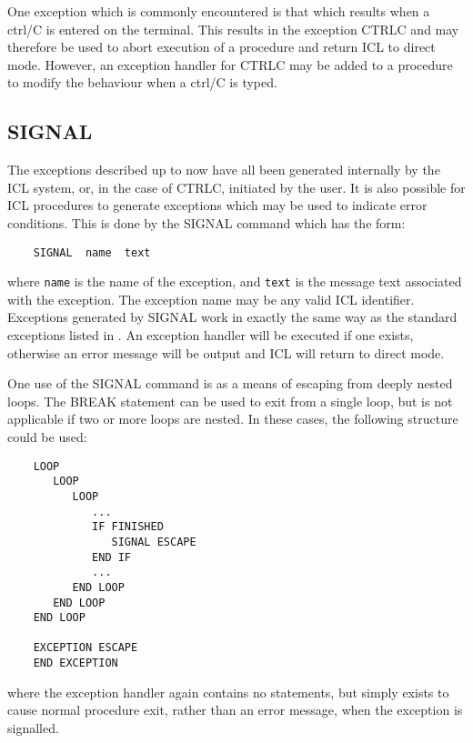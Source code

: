 One exception which is commonly encountered is that which results when a
ctrl/C is entered on the terminal.
This results in the exception CTRLC and may therefore be used to abort execution
of a procedure and return ICL to direct mode.
However, an exception handler for CTRLC may be added to a procedure to modify
the behaviour when a ctrl/C is typed.

\subsection{SIGNAL}

The exceptions described up to now have all been generated internally by the
ICL system, or, in the case of CTRLC, initiated by the user.
It is also possible for ICL procedures to generate exceptions which may be used
to indicate error conditions.
This is done by the SIGNAL command which has the form:

\begin{small}
\begin{verbatim}
    SIGNAL  name  text
\end{verbatim}
\end{small}

where \verb+name+ is the name of the exception, and \verb+text+ is the message
text associated with the exception.
The exception name may be any valid ICL identifier.
Exceptions generated by SIGNAL work in exactly the same way as the standard
exceptions listed in .
An exception handler will be executed if one exists, otherwise an error message
will be output and ICL will return to direct mode.

One use of the SIGNAL command is as a means of escaping from deeply nested
loops.
The BREAK statement can be used to exit from a single loop, but is not
applicable if two or more loops are nested.
In these cases, the following structure could be used:

\begin{small}
\begin{verbatim}
    LOOP
       LOOP
          LOOP
             ...
             IF FINISHED
                SIGNAL ESCAPE
             END IF
             ...
          END LOOP
       END LOOP
    END LOOP

    EXCEPTION ESCAPE
    END EXCEPTION
\end{verbatim}
\end{small}

where the exception handler again contains no statements, but simply exists
to cause normal procedure exit, rather than an error message, when the
exception is signalled.

